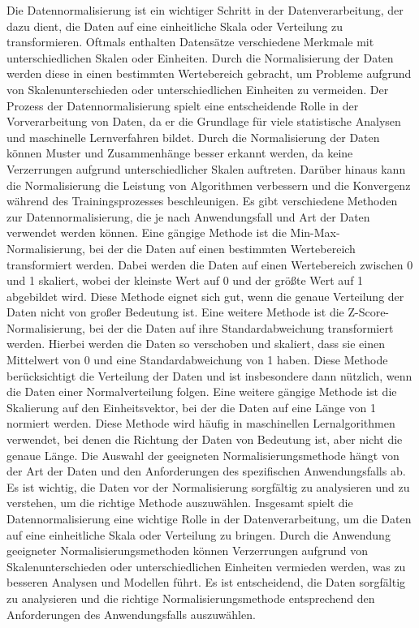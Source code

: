     Die Datennormalisierung ist ein wichtiger Schritt in der Datenverarbeitung, der dazu dient, die Daten auf eine einheitliche Skala oder Verteilung zu transformieren. 
    Oftmals enthalten Datensätze verschiedene Merkmale mit unterschiedlichen Skalen oder Einheiten. 
    Durch die Normalisierung der Daten werden diese in einen bestimmten Wertebereich gebracht, um Probleme aufgrund von Skalenunterschieden oder unterschiedlichen Einheiten zu vermeiden.
    Der Prozess der Datennormalisierung spielt eine entscheidende Rolle in der Vorverarbeitung von Daten, da er die Grundlage für viele statistische Analysen und maschinelle Lernverfahren bildet. 
    Durch die Normalisierung der Daten können Muster und Zusammenhänge besser erkannt werden, da keine Verzerrungen aufgrund unterschiedlicher Skalen auftreten. 
    Darüber hinaus kann die Normalisierung die Leistung von Algorithmen verbessern und die Konvergenz während des Trainingsprozesses beschleunigen.
    Es gibt verschiedene Methoden zur Datennormalisierung, die je nach Anwendungsfall und Art der Daten verwendet werden können. 
    Eine gängige Methode ist die Min-Max-Normalisierung, bei der die Daten auf einen bestimmten Wertebereich transformiert werden. 
    Dabei werden die Daten auf einen Wertebereich zwischen 0 und 1 skaliert, wobei der kleinste Wert auf 0 und der größte Wert auf 1 abgebildet wird. 
    Diese Methode eignet sich gut, wenn die genaue Verteilung der Daten nicht von großer Bedeutung ist.
    Eine weitere Methode ist die Z-Score-Normalisierung, bei der die Daten auf ihre Standardabweichung transformiert werden. 
    Hierbei werden die Daten so verschoben und skaliert, dass sie einen Mittelwert von 0 und eine Standardabweichung von 1 haben. 
    Diese Methode berücksichtigt die Verteilung der Daten und ist insbesondere dann nützlich, wenn die Daten einer Normalverteilung folgen.
    Eine weitere gängige Methode ist die Skalierung auf den Einheitsvektor, bei der die Daten auf eine Länge von 1 normiert werden. 
    Diese Methode wird häufig in maschinellen Lernalgorithmen verwendet, bei denen die Richtung der Daten von Bedeutung ist, aber nicht die genaue Länge.
    Die Auswahl der geeigneten Normalisierungsmethode hängt von der Art der Daten und den Anforderungen des spezifischen Anwendungsfalls ab. 
    Es ist wichtig, die Daten vor der Normalisierung sorgfältig zu analysieren und zu verstehen, um die richtige Methode auszuwählen.
    Insgesamt spielt die Datennormalisierung eine wichtige Rolle in der Datenverarbeitung, um die Daten auf eine einheitliche Skala oder Verteilung zu bringen. 
    Durch die Anwendung geeigneter Normalisierungsmethoden können Verzerrungen aufgrund von Skalenunterschieden oder unterschiedlichen Einheiten vermieden werden, was zu besseren Analysen und Modellen führt. 
    Es ist entscheidend, die Daten sorgfältig zu analysieren und die richtige Normalisierungsmethode entsprechend den Anforderungen des Anwendungsfalls auszuwählen.

